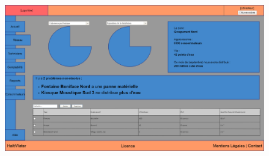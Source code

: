 \documentclass[a4paper, 11pt]{article}
\begin{document}
  \begin{figure}
    \centering
    \includegraphics[width=\textwidth]{Cahier_des_Charges/reseau}
  \end{figure}
\end{document}
